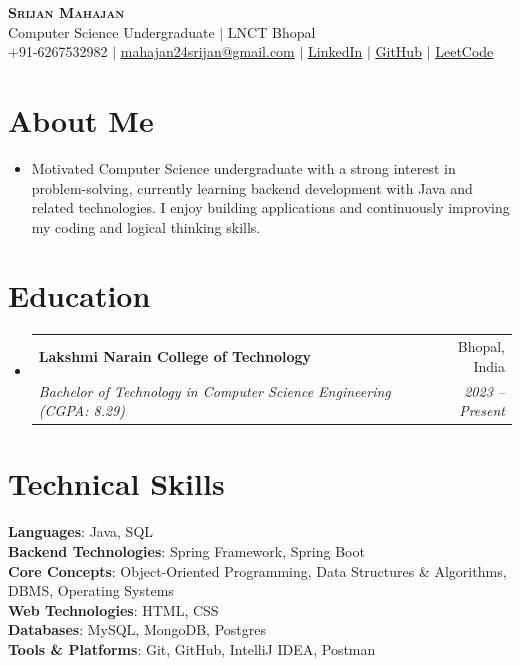 \documentclass[letterpaper,11pt]{article}
\makeatletter
\newcommand{\resumeItem}[1]{
  \item\normalsize{
    {#1 \vspace{-2pt}}
  }
}
\newcommand{\resumeSubheading}[4]{
  \item
    \begin{tabular*}{0.97\textwidth}[t]{l@{\extracolsep{\fill}}r}
      \textbf{#1} & #2 \\
      \textit{\small#3} & \textit{\small #4} \\
    \end{tabular*}
}
\newcommand{\resumeSubHeadingListStart}{\begin{itemize}[leftmargin=0.15in, label={}, itemsep=5pt, topsep=2pt, parsep=0pt, partopsep=0pt]}
\newcommand{\resumeSubHeadingListEnd}{\end{itemize}}
\makeatother
\begin{document}
\begin{center}
    \textbf{\Huge \scshape Srijan Mahajan} \\ \vspace{2pt}
    \small Computer Science Undergraduate $|$ LNCT Bhopal \\ \vspace{2pt}
    \small +91-6267532982 $|$ \href{mailto:mahajan24srijan@gmail.com}{\underline{mahajan24srijan@gmail.com}} $|$ 
    \href{https://linkedin.com/in/srijan-mahajan}{\underline{LinkedIn}} $|$
    \href{https://github.com/srijan-mahajan}{\underline{GitHub}} $|$
    \href{https://leetcode.com/u/Srijan_Mahajan/}{\underline{LeetCode}}
\end{center}

\section{About Me}
  \resumeSubHeadingListStart
    \resumeItem{Motivated Computer Science undergraduate with a strong interest in problem-solving, currently learning backend development with Java and related technologies. I enjoy building applications and continuously improving my coding and logical thinking skills.}
  \resumeSubHeadingListEnd

\section{Education}
  \resumeSubHeadingListStart
    \resumeSubheading
      {Lakshmi Narain College of Technology}{Bhopal, India}
      {Bachelor of Technology in Computer Science Engineering (CGPA: 8.29)}{2023 -- Present}
  \resumeSubHeadingListEnd

\section{Technical Skills}
 \begin{itemize}[leftmargin=0.15in, label={}, itemsep=0pt, topsep=2pt]
    \small{\item{
     \textbf{Languages}{: Java, SQL} \\[3pt]
     \textbf{Backend Technologies}{: Spring Framework, Spring Boot} \\[3pt]
     \textbf{Core Concepts}{: Object-Oriented Programming, Data Structures \& Algorithms, DBMS, Operating Systems} \\[3pt]
     \textbf{Web Technologies}{: HTML, CSS} \\[3pt]
     \textbf{Databases}{: MySQL, MongoDB, Postgres} \\[3pt]
     \textbf{Tools \& Platforms}{: Git, GitHub, IntelliJ IDEA, Postman}
    }}
 \end{itemize}
\end{document}
